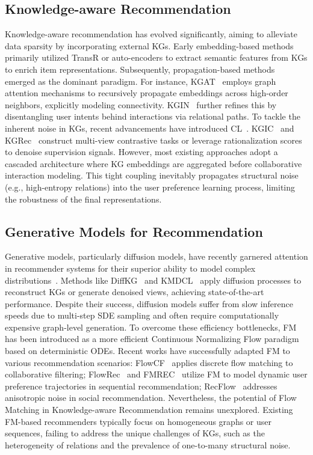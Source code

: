 \subsection{Knowledge-aware Recommendation}
Knowledge-aware recommendation has evolved significantly, aiming to alleviate data sparsity by incorporating external KGs. Early embedding-based methods~\cite{zhang2016collaborative,cao2019unifying,wang2018dkn} primarily utilized TransR or auto-encoders to extract semantic features from KGs to enrich item representations.
Subsequently, propagation-based methods~\cite{wang2019kgat,wang2021learning,yang2022knowledge,yang2023knowledge,zou2022improving,zou2024knowledge,li2025hypercomplex,li2025lightkg} emerged as the dominant paradigm. For instance, KGAT~\cite{wang2019kgat} employs graph attention mechanisms to recursively propagate embeddings across high-order neighbors, explicitly modeling connectivity. KGIN~\cite{wang2021learning} further refines this by disentangling user intents behind interactions via relational paths.
To tackle the inherent noise in KGs, recent advancements have introduced CL~\cite{zou2022improving,yang2023knowledge}. KGIC~\cite{zou2022improving} and KGRec~\cite{yang2023knowledge} construct multi-view contrastive tasks or leverage rationalization scores to denoise supervision signals.
However, most existing approaches adopt a cascaded architecture where KG embeddings are aggregated before collaborative interaction modeling. This tight coupling inevitably propagates structural noise (e.g., high-entropy relations) into the user preference learning process, limiting the robustness of the final representations.

\subsection{Generative Models for Recommendation}
Generative models, particularly diffusion models, have recently garnered attention in recommender systems for their superior ability to model complex distributions~\cite{lin2025diffusion,wei2025diffusion}. Methods like DiffKG~\cite{jiang2024diffkg} and KMDCL~\cite{li2025mask} apply diffusion processes to reconstruct KGs or generate denoised views, achieving state-of-the-art performance. Despite their success, diffusion models suffer from slow inference speeds due to multi-step SDE sampling and often require computationally expensive graph-level generation.
To overcome these efficiency bottlenecks, FM~\cite{lipman2023flow} has been introduced as a more efficient Continuous Normalizing Flow paradigm based on deterministic ODEs. Recent works have successfully adapted FM to various recommendation scenarios: FlowCF~\cite{liu2025flow} applies discrete flow matching to collaborative filtering; FlowRec~\cite{li2025preference} and FMREC~\cite{ijcai2025p346} utilize FM to model dynamic user preference trajectories in sequential recommendation; RecFlow~\cite{huangflow} addresses anisotropic noise in social recommendation.
Nevertheless, the potential of Flow Matching in Knowledge-aware Recommendation remains unexplored. Existing FM-based recommenders typically focus on homogeneous graphs or user sequences, failing to address the unique challenges of KGs, such as the heterogeneity of relations and the prevalence of one-to-many structural noise.